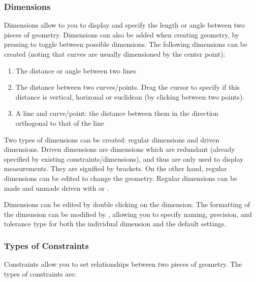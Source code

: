 \subsubsection{Dimensions}
Dimensions allow to you to display and specify the length or angle between two pieces of geometry. Dimensions can also be added when creating geometry, by pressing  to toggle between possible dimensions. The following dimensions can be created (noting that curves are usually dimensioned by the center point):

\begin{enumerate}
\item The distance or angle between two lines
\item The distance between two curves/points. Drag the cursor to specify if this distance is vertical, horizonal or euclidean (by clicking between two points).
\item A line and curve/point: the distance between them in the direction orthogonal to that of the line
\end{enumerate}

Two types of dimensions can be created: regular dimensions and driven dimensions. Driven dimensions are dimensions which are redundant (already specified by existing constraints/dimensions), and thus are only used to display measurements. They are signified by brackets. On the other hand, regular dimensions can be edited to change the geometry. Regular dimensions can be made and unmade driven with  or .

Dimensions can be edited by double clicking on the dimension. The formatting of the dimension can be modified by , allowing you to specify naming, precision, and tolerance type for both the individual dimension and the default settings.


\subsubsection{Types of Constraints}

Constraints allow you to set relationships between two pieces of geometry. The types of constraints are:

